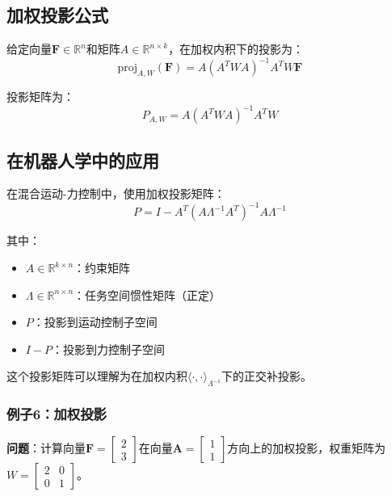 \documentclass[12pt,a4paper]{article}
\begin{document}
\subsection{加权投影公式}

给定向量$\bm{F} \in \mathbb{R}^n$和矩阵$A \in \mathbb{R}^{n \times k}$，在加权内积下的投影为：
\begin{equation}
\text{proj}_{A,W}(\bm{F}) = A (A^T W A)^{-1} A^T W \bm{F}
\label{eq:weighted_projection}
\end{equation}

投影矩阵为：
\begin{equation}
P_{A,W} = A (A^T W A)^{-1} A^T W
\label{eq:weighted_projection_matrix}
\end{equation}

\subsection{在机器人学中的应用}

在混合运动-力控制中，使用加权投影矩阵：
\begin{equation}
P = I - A^T (A \Lambda^{-1} A^T)^{-1} A \Lambda^{-1}
\label{eq:hybrid_projection}
\end{equation}

其中：
\begin{itemize}
\item $A \in \mathbb{R}^{k \times n}$：约束矩阵
\item $\Lambda \in \mathbb{R}^{n \times n}$：任务空间惯性矩阵（正定）
\item $P$：投影到运动控制子空间
\item $I - P$：投影到力控制子空间
\end{itemize}

这个投影矩阵可以理解为在加权内积$\langle \cdot, \cdot \rangle_{\Lambda^{-1}}$下的正交补投影。

\subsubsection{例子6：加权投影}

\textbf{问题}：计算向量$\bm{F} = \begin{bmatrix} 2 \\ 3 \end{bmatrix}$在向量$\bm{A} = \begin{bmatrix} 1 \\ 1 \end{bmatrix}$方向上的加权投影，权重矩阵为$W = \begin{bmatrix} 2 & 0 \\ 0 & 1 \end{bmatrix}$。
\end{document}
